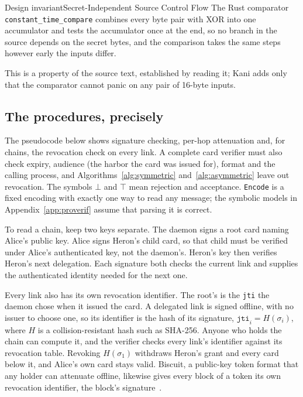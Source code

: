 \documentclass[11pt,a4paper]{article}
\theoremstyle{definition}
\begin{document}
\begin{pdclaim}{Design invariant}{Secret-Independent Source Control Flow}
\setlength{\parskip}{4pt plus 1pt}
\label{inv:anchor-ct-source}
The Rust comparator \texttt{constant\_time\_compare} combines every byte pair with XOR into one accumulator and tests the accumulator once at the end, so no branch in the source depends on the secret bytes, and the comparison takes the same steps however early the inputs differ.

This is a property of the source text, established by reading it; Kani adds only that the comparator cannot panic on any pair of 16-byte inputs.
\end{pdclaim}

\subsection{The procedures, precisely}\label{sec:algorithms}

The pseudocode below shows signature checking, per-hop attenuation and, for
chains, the revocation check on every link. A complete card verifier must also
check expiry, audience (the harbor the card was issued for), format and the
calling process, and Algorithms~\ref{alg:symmetric} and~\ref{alg:asymmetric}
leave out revocation. The symbols $\bot$ and $\top$ mean rejection and
acceptance. \texttt{Encode} is a fixed encoding with exactly one way to read
any message; the symbolic models in Appendix~\ref{app:proverif} assume that
parsing it is correct.

To read a chain, keep two keys separate. The daemon signs a root card naming
Alice's public key. Alice signs Heron's child card, so that child must be
verified under Alice's authenticated key, not the daemon's. Heron's key then
verifies Heron's next delegation. Each signature both checks the current link
and supplies the authenticated identity needed for the next one.

Every link also has its own revocation identifier. The root's is the
\texttt{jti} the daemon chose when it issued the card. A delegated link is
signed offline, with no issuer to choose one, so its identifier is the hash of
its signature, $\texttt{jti}_i = H(\sigma_i)$, where $H$ is a
collision-resistant hash such as SHA-256. Anyone who holds the chain can
compute it, and the verifier checks every link's identifier against its
revocation table. Revoking $H(\sigma_1)$ withdraws Heron's grant and every card
below it, and Alice's own card stays valid. Biscuit, a public-key token format
that any holder can attenuate offline, likewise gives every block of a token
its own revocation identifier, the block's signature~.
\end{document}
